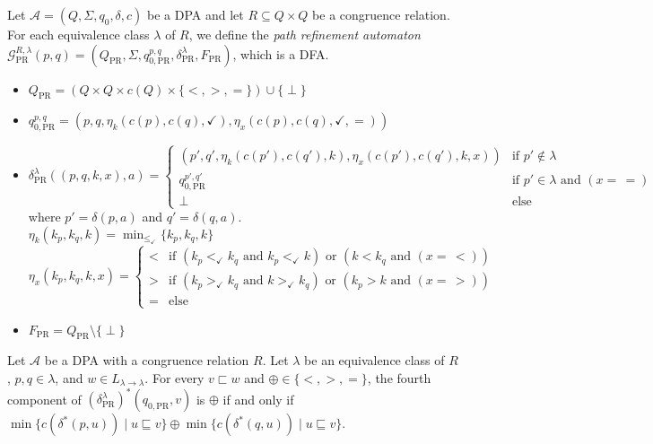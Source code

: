 \begin{defn}
	Let $\mathcal{A} = (Q, \Sigma, q_0, \delta, c)$ be a DPA and let $R \subseteq Q \times Q$ be a congruence relation. For each equivalence class $\lambda$ of $R$, we define the \emph{path refinement automaton} $\mathcal{G}_\text{PR}^{R,\lambda}(p, q) = (Q_\text{PR}, \Sigma, q_{0, \text{PR}}^{p,q}, \delta^\lambda_\text{PR}, F_\text{PR})$, which is a DFA.
	
	\begin{itemize}
		\item $Q_\text{PR} = (Q \times Q \times c(Q) \times \{<, >, =\}) \cup \{ \perp \}$
		\item $q_{0, \text{PR}}^{p,q} = (p, q, \eta_k(c(p), c(q), \checkmark), \eta_x(c(p), c(q), \checkmark, =))$
		\item $\delta^\lambda_\text{PR}((p, q, k, x), a) = \begin{cases}
			(p', q', \eta_k(c(p'), c(q'), k), \eta_x(c(p'), c(q'), k, x)) & \text{if } p' \notin \lambda \\
			q_{0,\text{PR}}^{p',q'} & \text{if } p' \in \lambda \text{ and } (x =\, =) \\
			\perp & \text{else}
		\end{cases}$ \\
			where $p' = \delta(p, a)$ and $q' = \delta(q, a)$. \\
			$\eta_k(k_p, k_q, k) = \min_{\leq_\checkmark} \{k_p, k_q, k\}$ \\
			$\eta_x(k_p, k_q, k, x) = \begin{cases}
				< & \text{if } (k_p <_\checkmark k_q \text{ and } k_p <_\checkmark k) \text{ or } (k < k_q \text{ and } (x =\, <)) \\
				> & \text{if } (k_p >_\checkmark k_q \text{ and } k >_\checkmark k_q) \text{ or } (k_p > k \text{ and } (x =\, >)) \\
				= & \text{else}
			\end{cases}$ 
		\item $F_\text{PR} = Q_\text{PR} \setminus \{\perp\}$
	\end{itemize}
\end{defn}

\begin{lem}
	Let $\mathcal{A}$ be a DPA with a congruence relation $R$. Let $\lambda$ be an equivalence class of $R$, $p, q \in \lambda$, and $w \in L_{\lambda \rightarrow \lambda}$. For every $v \sqsubset w$ and $\oplus \in \{<, >, =\}$, the fourth component of $(\delta_\text{PR}^\lambda)^*(q_{0,\text{PR}}, v)$ is $\oplus$ if and only if $\min \{ c(\delta^*(p, u)) \mid u \sqsubseteq v \} \oplus \min \{ c(\delta^*(q, u)) \mid u \sqsubseteq v \}$.
	\label{lem:pr:pr_game_nx}
\end{lem}

